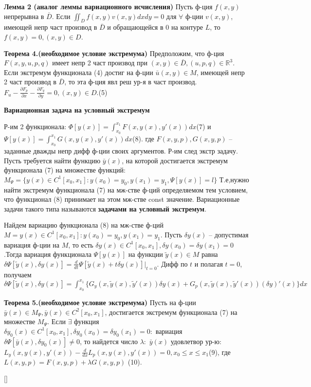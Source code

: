 \textbf{Лемма 2 (аналог леммы вариационного исчисления)}
    Пусть ф-ция $f(x, y)$ непрерывна в $\bar D$. Если
    $\iint_D f(x,y)v(x,y)dxdy=0$
    для $\forall$ ф-ции $v(x, y)$, имеющей непр част производ в $\bar D$ и обращающейся в 0 на контуре $L$, то $f(x, y) = 0, (x, y) \in D$.

\textbf{Теорема 4.(необходимое условие экстремума)}
    Предположим, что ф-ция $F(x, y, u, p, q)$ имеет
    непр 2 част производ при $(x, y) \in \bar D, (u, p, q) \in \mathbb{R}^3$.
    Если экстремум функционала (4) достиг на ф-ции $\bar u(x, y) \in M$, имеющей непр 2 част производ в $\bar D$, то эта ф-ция явл реш ур-я в част производ.$F_u-\frac{\partial F_p}{\partial x}-\frac{\partial F_q}{\partial y}=0, (x,y)\in D.$(5)

\textbf{Вариационная задача на условный экстремум}

Р-им 2 функционала: $\Phi[y(x)]=\int_{x_0}^{x_1} F(x,y(x),y'(x))dx$(7) и $\Psi[y(x)]=\int_{x_0}^{x_1} G(x,y(x),y'(x))dx$(8).
где $F(x, y, p), G(x, y, p)$ – заданные дважды непр дифф ф-ции своих аргументов.
Р-им след экстр задачу. Пусть требуется найти функцию $\bar y(x)$, на которой достигается экстремум функционала (7) на множестве функций:
$M_\Psi=\{y(x)\in C^1[x_0, x_1] : y(x_0) = y_0, y(x_1) = y_1, \Psi[y(x)]=l\}$
Т.е,нужно найти экстремум функционала (7) на
мж-стве ф-ций определяемом тем условием, что функционал (8)
принимает на этом мж-стве const значение. Вариационные задачи такого типа называются \textbf{задачами на условный экстремум}.

Найдем вариацию функционала (8) на мж-стве ф-ций 
$M = {y(x) \in C^1[x_0, x_1] : y(x_0) = y_0, y(x_1) = y_1}$.
Пусть $\delta y(x)$ – допустимая вариация ф-ции на $M$, то есть $\delta y(x) \in C^1[x_0, x_1], \delta y(x_0) = \delta y(x_1) = 0$.Тогда вариация функционала $\Psi [y(x)]$ на функции $\widetilde y(x)\in M$ равна $\delta \Psi[\widetilde y(x), \delta y(x)]=\frac{d}{dt}\Psi[\widetilde y(x) + t\delta y(x)]\Big|_{t=0}$. Дифф по $t$ и полагая $t = 0$, получаем 
$\delta\Psi[\widetilde y(x), \delta y(x)]= \int_{x_0}^{x_1}\Big\{G_y(x, \widetilde y(x), \widetilde y'(x))\delta y(x) + G_p(x, \widetilde y(x), \widetilde y'(x))(\delta y)'(x) \Big\}dx$

\textbf{Теорема 5.(необходимое условие экстремума)}
    Пусть на ф-ции $\bar y(x) \in M_\Psi, \bar y(x) \in C^2[x_0, x_1]$,
    достигается экстремум функционала (7) на множестве $M_\Psi$. Если
    $\exists$ функция $\delta y_0(x) \in C^1[x_0, x_1], \delta y_0(x_0) = \delta y_0(x_1) = 0:$ вариация $\delta\Psi[\bar y(x), \delta y_0(x)] \neq 0$, то найдется число $\lambda:$ $\bar y(x)$ удовлетвор ур-ю: $L_y(x, y(x), y'(x))-\frac{d}{dx}L_p(x, y(x), y'(x))=0, x_0 \leq x \leq x_1$(9), где $L(x, y, p) = F(x, y, p) + \lambda G(x, y, p)$ (10).
    
[\cite{denisov2}]
